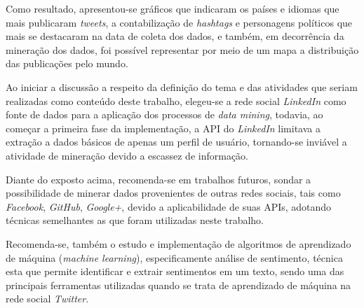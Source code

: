 Como resultado, apresentou-se gráficos que indicaram os países e idiomas que mais publicaram \textit{tweets}, a contabilização de \textit{hashtags} e personagens políticos que mais se destacaram na data de coleta dos dados, e também, em decorrência da mineração dos dados, foi possível representar por meio de um mapa a distribuição das publicações pelo mundo.  

Ao iniciar a discussão a respeito da definição do tema e das atividades que seriam realizadas como conteúdo deste trabalho, elegeu-se a rede social \textit{LinkedIn} como fonte de dados para a aplicação dos processos de \textit{data mining}, todavia, ao começar a primeira fase da implementação, a API do \textit{LinkedIn} limitava a extração a dados básicos de apenas um perfil de usuário, tornando-se inviável a atividade de mineração devido a escassez de informação.

Diante do exposto acima, recomenda-se em trabalhos futuros, sondar a possibilidade de minerar dados provenientes de outras redes sociais, tais como \textit{Facebook}, \textit{GitHub}, \textit{Google+}, devido a aplicabilidade de suas APIs, adotando técnicas semelhantes as que foram utilizadas neste trabalho.

Recomenda-se, também o estudo e implementação de algoritmos de aprendizado de máquina (\textit{machine learning}), especificamente análise de sentimento, técnica esta que permite identificar e extrair sentimentos em um texto, sendo uma das principais ferramentas utilizadas quando se trata de aprendizado de máquina na rede social \textit{Twitter}.











